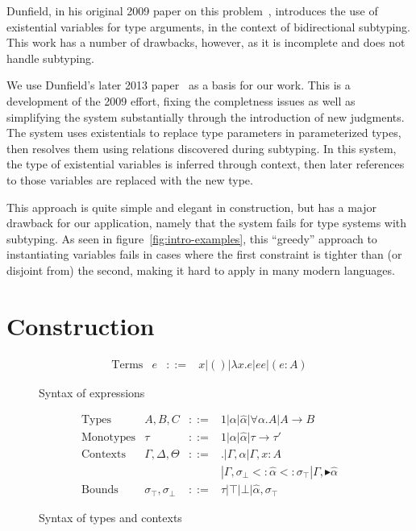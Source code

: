 \documentclass{sig-alternate}
\newcommand{\botbound}{\sigma_\bot}
\newcommand{\topbound}{\sigma_\top}
\newcommand{\marker}[1]{\scriptscriptstyle {\blacktriangleright #1}}
\newcommand{\tst}{{\scriptstyle{<:}}}
\newcommand{\bound}[3]{#1 \tst #2 \tst #3}
\begin{document}
Dunfield, in his original 2009 paper on this problem~\cite{Dunfield09:polymorphism}, introduces the use of existential variables for type arguments, in the context of bidirectional subtyping. This work has a number of drawbacks, however, as it is incomplete and does not handle subtyping.

We use Dunfield's later 2013 paper~\cite{Dunfield:2013:CEB:2544174.2500582} as a basis for our work. This is a development of the 2009 effort, fixing the completness issues as well as simplifying the system substantially through the introduction of new judgments. The system uses existentials to replace type parameters in parameterized types, then resolves them using relations discovered during subtyping. In this system, the type of existential variables is inferred through context, then later references to those variables are replaced with the new type.

This approach is quite simple and elegant in construction, but has a major drawback for our application, namely that the system fails for type systems with subtyping. As seen in figure~\ref{fig:intro-examples}, this ``greedy'' approach to instantiating variables fails in cases where the first constraint is tighter than (or disjoint from) the second, making it hard to apply in many modern languages. 
\section{Construction}

\begin{figure}
\[
\begin{array}{lccl}
\text{Terms} & e &::=& x | () | \lambda x.e | e e | (e : A)
\end{array}
\]
\caption{Syntax of expressions}
\label{fig:term}
\end{figure}

\begin{figure}
\[
\begin{array}{lccl}
\text{Types} & A,B,C &::=& 1 | \alpha | \hat{\alpha} | \forall \alpha.A | A \rightarrow B\\
\text{Monotypes} & \tau &::=& 1 | \alpha | \hat{\alpha} | \tau \rightarrow \tau'\\
\text{Contexts} & \Gamma, \Delta, \Theta &::=& . | \Gamma, \alpha | \Gamma, x:A \\ &&& | \Gamma, \bound{\botbound}{\hat{\alpha}}{\topbound} | \Gamma, \marker{\hat{\alpha}}\\
\text{Bounds} & \topbound, \botbound &::=& \tau | \top | \bot | \hat{\alpha}, \topbound
\end{array}
\]
\caption{Syntax of types and contexts}
\label{fig:cons}
\end{figure}
\end{document}
